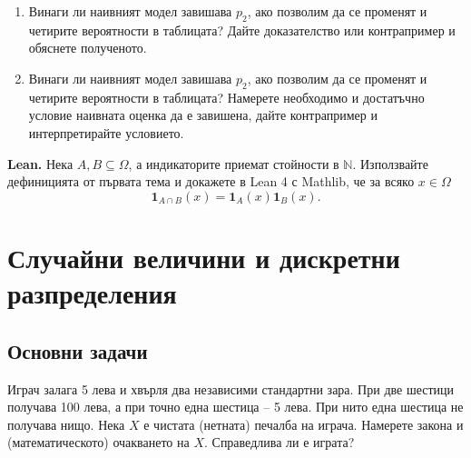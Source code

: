 \documentclass[11pt,a4paper]{article}
\newenvironment{enumeratea}{\begin{enumerate}[label=(\alph*),itemsep=0.28em,topsep=0.25em]}{\end{enumerate}}
\newcommand{\ind}{\mathbf 1}
\newcounter{problem}[section]
\begin{document}
\begin{researchtask}
\begin{enumeratea}
  \item Винаги ли наивният модел завишава $p_2$, ако позволим да се променят
  и четирите вероятности в таблицата? Дайте доказателство или контрапример
  и обяснете полученото.
    \item Винаги ли наивният модел завишава $p_2$, ако позволим да се променят
  и четирите вероятности в таблицата? Намерете необходимо и достатъчно
  условие наивната оценка да е завишена, дайте контрапример и
  интерпретирайте условието.    
\end{enumeratea}
%
%
%
\end{researchtask}

\noindent\textbf{Lean.} Нека $A,B\subseteq\Omega$, а индикаторите приемат
стойности в $\mathbb N$. Използвайте дефиницията от първата тема и докажете
в Lean 4 с Mathlib, че за всяко $x\in\Omega$
\[
\ind_{A\cap B}(x)=\ind_A(x)\ind_B(x).
\]


\section{Случайни величини и дискретни разпределения}

\subsection*{Основни задачи}

\begin{problembook}
Играч залага 5 лева и хвърля два независими стандартни зара. При две шестици получава 100 лева, а
при точно една шестица -- 5 лева. При нито една шестица не получава нищо.
Нека $X$ е чистата (нетната) печалба на играча. Намерете закона и (математическото)
очакването на $X$. Справедлива ли е играта? 
\end{problembook}
\end{document}
